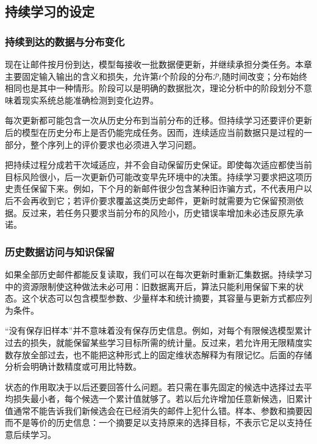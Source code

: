\subsection{持续学习的设定}
\label{sec:continual-settings-overview}

\subsubsection{持续到达的数据与分布变化}

现在让邮件按月份到达，模型每接收一批数据便更新，并继续承担分类任务。本章主要固定输入输出的含义和损失，允许第$t$个阶段的分布$\mathcal P_t$随时间改变；分布始终相同也是其中一种情形。阶段可以是明确的数据批次，理论分析中的阶段划分不意味着现实系统总能准确检测到变化边界。

每次更新都可能包含一次从历史分布到当前分布的迁移。但持续学习还要评价更新后的模型在历史分布上是否仍能完成任务。因而，连续适应当前数据只是过程的一部分，整个序列上的评价要求也必须进入学习问题。

把持续过程分成若干次域适应，并不会自动保留历史保证。即使每次适应都使当前目标风险很小，后一次更新仍可能改变早先环境中的决策。持续学习要求把这项历史责任保留下来。例如，下个月的新邮件很少包含某种旧诈骗方式，不代表用户以后不会再收到它；若评价要求覆盖这类历史邮件，更新时就需要为它保留预测依据。反过来，若任务只要求当前分布的风险小，历史错误率增加未必违反原先承诺。

\subsubsection{历史数据访问与知识保留}

如果全部历史邮件都能反复读取，我们可以在每次更新时重新汇集数据。持续学习中的资源限制使这种做法未必可用：旧数据离开后，算法只能利用保留下来的状态。这个状态可以包含模型参数、少量样本和统计摘要，其容量与更新方式都应列为条件。

“没有保存旧样本”并不意味着没有保存历史信息。例如，对每个有限候选模型累计过去的损失，就能保留某些学习目标所需的统计量。反过来，若允许用无限精度实数存放全部过去，也不能把这种形式上的固定维状态解释为有限记忆。后面的存储分析会明确计数精度或可用比特数。

状态的作用取决于以后还要回答什么问题。若只需在事先固定的候选中选择过去平均损失最小者，每个候选一个累计值就够了。若以后允许增加任意新候选，旧累计值通常不能告诉我们新候选会在已经消失的邮件上犯什么错。样本、参数和摘要因而不是等价的历史信息：一个摘要足以支持原来的选择目标，不表示它足以支持任意后续学习。

